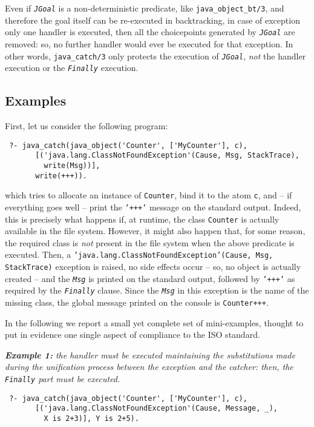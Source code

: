 Even if \texttt{\textit{JGoal}} is a non-deterministic predicate, like
\texttt{java\_object\_bt/3}, and therefore the goal itself can be re-executed in backtracking, in
case of exception only one handler is executed, then all the choicepoints generated by
\texttt{\textit{JGoal}} are removed: so, no further handler would ever be executed for that
exception. In other words, \texttt{java\_catch/3} only protects the execution of
\texttt{\textit{JGoal}}, \textit{not} the handler execution or the \texttt{\textit{Finally}}
execution.

\subsection{Examples}\label{ssec:jexamples}
First, let us consider the following program:
\begin{verbatim}
 ?- java_catch(java_object('Counter', ['MyCounter'], c),
       [('java.lang.ClassNotFoundException'(Cause, Msg, StackTrace),
         write(Msg))],
       write(+++)).
\end{verbatim}
which tries to allocate an instance of \texttt{Counter}, bind it to the atom \texttt{c}, and -- if
everything goes well -- print the \texttt{'+++'} message on the standard output.
%
Indeed, this is precisely what happens if, at runtime, the class \texttt{Counter} is actually
available in the file system. However, it might also happen that, for some reason, the required
class is \textit{not} present in the file system when the above predicate is executed. Then, a
\texttt{'java.lang.ClassNotFoundException'(Cause, Msg, StackTrace)} exception is raised, no side
effects occur -- so, no object is actually created -- and the \texttt{\textit{Msg}} is printed on
the standard output, followed by \texttt{'+++'} as required by the \texttt{\textit{Finally}}
clause. Since the \texttt{\textit{Msg}} in this exception is the name of the missing class, the
global message printed on the console is \texttt{Counter+++}.

\smallskip
In the following we report a small yet complete set of mini-examples, thought to put in evidence
one single aspect of \tuprolog{} compliance to the ISO standard.

\medskip
\textit{\textbf{Example 1:} the handler must be executed maintaining the substitutions made during
the unification process between the exception and the catcher: then, the \texttt{Finally} part
must be executed.}
\begin{verbatim}
 ?- java_catch(java_object('Counter', ['MyCounter'], c),
       [('java.lang.ClassNotFoundException'(Cause, Message, _),
         X is 2+3)], Y is 2+5).
\end{verbatim}

